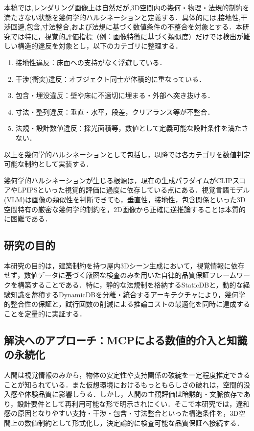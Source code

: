 \documentclass[dvipdfmx, a4paper, 9pt]{deimj}
\begin{document}
本稿では,レンダリング画像上は自然だが,3D空間内の幾何・物理・法規的制約を満たさない状態を幾何学的ハルシネーションと定義する．具体的には,接地性,干渉回避,包含,寸法整合,および法規に基づく数値条件の不整合を対象とする．本研究では特に，視覚的評価指標（例：画像特徴に基づく類似度）だけでは検出が難しい構造的違反を対象とし，以下のカテゴリに整理する．
\begin{enumerate}
    \item[(a)] 接地性違反：床面への支持がなく浮遊している．
    \item[(b)] 干渉(衝突)違反：オブジェクト同士が体積的に重なっている．
    \item[(c)] 包含・埋没違反：壁や床に不適切に埋まる・外部へ突き抜ける．
    \item[(d)] 寸法・整列違反：垂直・水平，段差，クリアランス等が不整合．
    \item[(e)] 法規・設計数値違反：採光面積等，数値として定義可能な設計条件を満たさない．
\end{enumerate}
以上を幾何学的ハルシネーションとして包括し，以降では各カテゴリを数値判定可能な制約として実装する．

幾何学的ハルシネーションが生じる根源は，現在の生成パラダイムがCLIPスコア\cite{radford2021clip}やLPIPS\cite{zhang2018lpips}といった視覚的評価に過度に依存している点にある．視覚言語モデル(VLM)は画像の類似性を判断できても，垂直性，接地性，包含関係といった3D空間特有の厳密な幾何学的制約を，2D画像から正確に逆推論することは本質的に困難である．

\subsection{研究の目的}

本研究の目的は，建築制約を持つ屋内3Dシーン生成において，視覚情報に依存せず，数値データに基づく厳密な検査のみを用いた自律的品質保証フレームワークを構築することである．特に，静的な法規制を格納するStaticDBと，動的な経験知識を蓄積するDynamicDBを分離・統合するアーキテクチャにより，幾何学的整合性の保証と，試行回数の削減による推論コストの最適化を同時に達成することを定量的に実証する．

\subsection{解決へのアプローチ：MCPによる数値的介入と知識の永続化}

人間は視覚情報のみから，物体の安定性や支持関係の破綻を一定程度推定できることが知られている．また仮想環境におけるもっともらしさの破れは，空間的没入感や体験品質に影響しうる．しかし，人間の主観評価は暗黙的・文脈依存であり，設計要件として再利用可能な形で明示されにくい．そこで本研究では，違和感の原因となりやすい支持・干渉・包含・寸法整合といった構造条件を，3D空間上の数値制約として形式化し，決定論的に検査可能な品質保証へ接続する．
\end{document}
